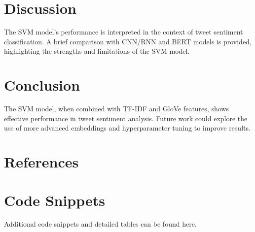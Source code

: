 \documentclass[12pt]{article}
\begin{document}
\section{Discussion}
The SVM model's performance is interpreted in the context of tweet sentiment classification. A brief comparison with CNN/RNN and BERT models is provided, highlighting the strengths and limitations of the SVM model.

\section{Conclusion}
The SVM model, when combined with TF-IDF and GloVe features, shows effective performance in tweet sentiment analysis. Future work could explore the use of more advanced embeddings and hyperparameter tuning to improve results.

\section*{References}



\appendix
\section{Code Snippets}
Additional code snippets and detailed tables can be found here.
\end{document}
